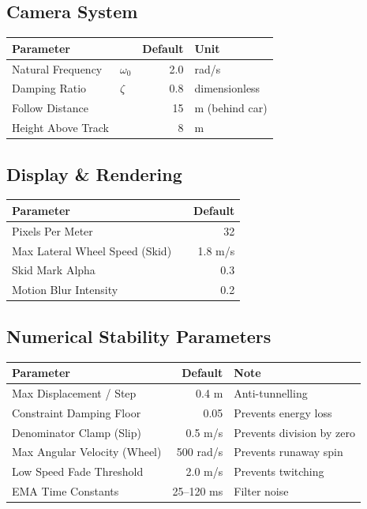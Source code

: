 \subsection{Camera System}

\begin{table}[H]
\centering
\begin{tabular}{|l|l|r|l|}
\hline
\textbf{Parameter} & & \textbf{Default} & \textbf{Unit} \\
\hline
Natural Frequency & $\omega_0$ & 2.0 & rad/s \\
Damping Ratio & $\zeta$ & 0.8 & dimensionless \\
Follow Distance & & 15 & m (behind car) \\
Height Above Track & & 8 & m \\
\hline
\end{tabular}
\end{table}

\subsection{Display \& Rendering}

\begin{table}[H]
\centering
\begin{tabular}{|l|l|r|}
\hline
\textbf{Parameter} & & \textbf{Default} \\
\hline
Pixels Per Meter & & 32 \\
Max Lateral Wheel Speed (Skid) & & 1.8 m/s \\
Skid Mark Alpha & & 0.3 \\
Motion Blur Intensity & & 0.2 \\
\hline
\end{tabular}
\end{table}

\subsection{Numerical Stability Parameters}

\begin{table}[H]
\centering
\begin{tabular}{|l|r|l|}
\hline
\textbf{Parameter} & \textbf{Default} & \textbf{Note} \\
\hline
Max Displacement / Step & 0.4 m & Anti-tunnelling \\
Constraint Damping Floor & 0.05 & Prevents energy loss \\
Denominator Clamp (Slip) & 0.5 m/s & Prevents division by zero \\
Max Angular Velocity (Wheel) & 500 rad/s & Prevents runaway spin \\
Low Speed Fade Threshold & 2.0 m/s & Prevents twitching \\
EMA Time Constants & 25–120 ms & Filter noise \\
\hline
\end{tabular}
\end{table}

